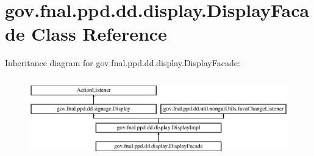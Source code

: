 \hypertarget{classgov_1_1fnal_1_1ppd_1_1dd_1_1display_1_1DisplayFacade}{\section{gov.\-fnal.\-ppd.\-dd.\-display.\-Display\-Facade Class Reference}
\label{classgov_1_1fnal_1_1ppd_1_1dd_1_1display_1_1DisplayFacade}
}
Inheritance diagram for gov.\-fnal.\-ppd.\-dd.\-display.\-Display\-Facade\-:\begin{figure}[H]
\begin{center}
\leavevmode
\includegraphics[height=3.555556cm]{classgov_1_1fnal_1_1ppd_1_1dd_1_1display_1_1DisplayFacade}
\end{center}
\end{figure}
